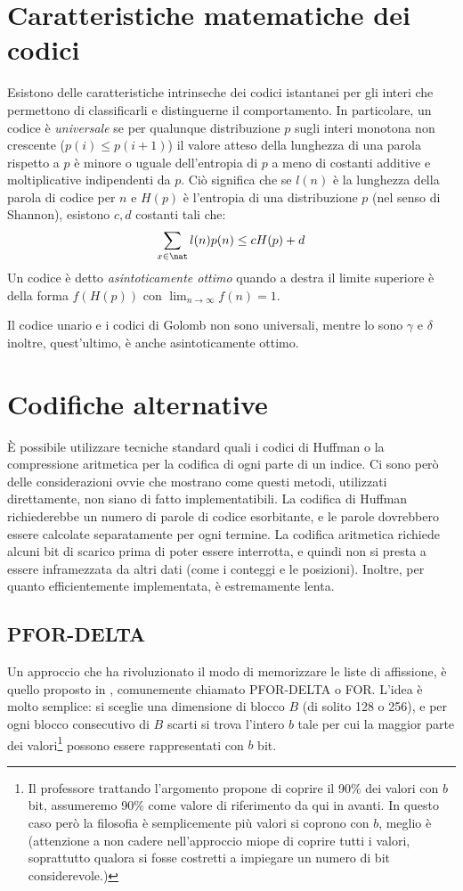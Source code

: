 \section{Caratteristiche matematiche dei codici}
Esistono delle caratteristiche intrinseche dei codici istantanei per gli interi che permettono di classificarli e distinguerne il comportamento. In particolare, un codice è \textit{universale} se per qualunque distribuzione $p$ sugli interi monotona non crescente ($p(i) \leq p(i + 1)$) il valore atteso della lunghezza di una parola rispetto a $p$ è minore o uguale dell'entropia di $p$ a meno di costanti additive e moltiplicative indipendenti da $p$. Ciò significa che se $l(n)$ è la lunghezza della parola di codice per $n$ e $H(p)$ è l'entropia di una distribuzione $p$ (nel senso di Shannon), esistono $c, d$ costanti tali che:
\begin{equation*}
    \sum_{x \in \nat}{l(n)p(n)} \leq cH(p) + d
\end{equation*}
Un codice è detto \textit{asintoticamente ottimo} quando a destra il limite superiore è della forma $f(H(p))$ con $\lim_{n \to \infty} f(n) = 1$.

Il codice unario e i codici di Golomb non sono universali, mentre lo sono $\gamma$ e $\delta$ inoltre, quest'ultimo, è anche asintoticamente ottimo.
\section{Codifiche alternative}
È possibile utilizzare tecniche standard quali i codici di Huffman o la compressione aritmetica per la codifica di ogni parte di un indice. Ci sono però delle considerazioni ovvie che mostrano come questi metodi, utilizzati direttamente, non siano di fatto implementatibili. La codifica di Huffman richiederebbe un numero di parole di codice esorbitante, e le parole dovrebbero essere calcolate separatamente per ogni termine. La codifica aritmetica richiede alcuni bit di scarico prima di poter essere interrotta, e quindi non si presta a essere inframezzata da altri dati (come i conteggi e le posizioni). Inoltre, per quanto efficientemente implementata, è estremamente lenta.
\subsection{PFOR-DELTA}
Un approccio che ha rivoluzionato il modo di memorizzare le liste di affissione, è quello proposto in \cite{pfordelta}, comunemente chiamato PFOR-DELTA o FOR. L'idea è molto semplice: si sceglie una dimensione di blocco $B$ (di solito 128 o 256), e per ogni blocco consecutivo di $B$ scarti si trova l'intero $b$ tale per cui la maggior parte dei valori\footnote{Il professore trattando l'argomento propone di coprire il 90\% dei valori con $b$ bit, assumeremo 90\% come valore di riferimento da qui in avanti. In questo caso però la filosofia è semplicemente più valori si coprono con $b$, meglio è (attenzione a non cadere nell'approccio miope di coprire tutti i valori, soprattutto qualora si fosse costretti a impiegare un numero di bit considerevole.)} possono essere rappresentati con $b$ bit.

